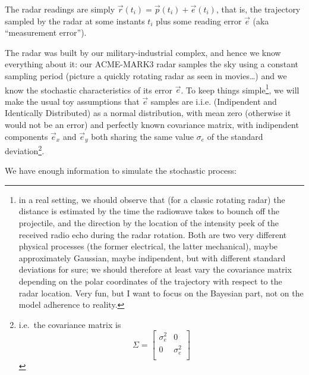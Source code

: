 \documentclass[]{article}
\begin{document}
The radar readings are simply
\(\overrightarrow{r}(t_i)=\overrightarrow{p}(t_i)+\overrightarrow{e}(t_i)\),
that is, the trajectory sampled by the radar at some instants \(t_i\)
plus some reading error \(\overrightarrow{e}\) (aka ``measurement
error'').

The radar was built by our military-industrial complex, and hence we
know everything about it: our ACME-MARK3 radar samples the sky using a
constant sampling period (picture a quickly rotating radar as seen in
movies\ldots{}) and we know the stochastic characteristics of its error
\(\overrightarrow{e}\). To keep things simple\footnote{in a real
  setting, we should observe that (for a classic rotating radar) the
  distance is estimated by the time the radiowave takes to bounch off
  the projectile, and the direction by the location of the intensity
  peek of the received radio echo during the radar rotation. Both are
  two very different physical processes (the former electrical, the
  latter mechanical), maybe approximately Gaussian, maybe indipendent,
  but with different standard deviations for sure; we should therefore
  at least vary the covariance matrix depending on the polar coordinates
  of the trajectory with respect to the radar location. Very fun, but I
  want to focus on the Bayesian part, not on the model adherence to
  reality.}, we will make the usual toy assumptions that
\(\overrightarrow{e}\) samples are i.i.e. (Indipendent and Identically
Distributed) as a normal distribution, with mean zero (otherwise it
would not be an error) and perfectly known covariance matrix, with
indipendent components \(\overrightarrow{e}_x\) and
\(\overrightarrow{e}_y\) both sharing the same value \(\sigma_e\) of the
standard deviation\footnote{i.e.~the covariance matrix is
  \[\Sigma = \begin{bmatrix} \sigma_e^2 & 0 \\
  0 & \sigma_e^2  \\
  \end{bmatrix} \]}.

We have enough information to simulate the stochastic process:
\end{document}
